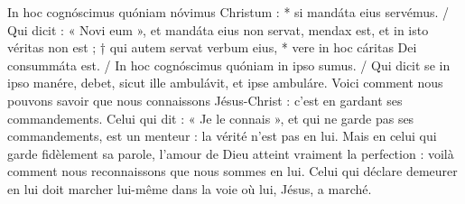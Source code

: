 \documentclass[Session2024.tex]{subfiles}
\begin{document}
{In hoc cognóscimus quóniam nóvimus Christum : * si mandáta eius
servémus. / Qui dicit : « Novi eum », et mandáta eius non servat, mendax
est, et in isto véritas non est ; † qui autem servat verbum eius, * vere in
hoc cáritas Dei consummáta est. / In hoc cognóscimus quóniam in ipso
sumus. / Qui dicit se in ipso manére, debet, sicut ille ambulávit, et ipse
ambuláre.}
{Voici comment nous pouvons savoir que nous connaissons Jésus-Christ :
c’est en gardant ses commandements. Celui qui dit : « Je le connais »,
et qui ne garde pas ses commandements, est un menteur : la vérité n’est
pas en lui. Mais en celui qui garde fidèlement sa parole, l’amour de Dieu
atteint vraiment la perfection : voilà comment nous reconnaissons que
nous sommes en lui. Celui qui déclare demeurer en lui doit marcher lui-même
dans la voie où lui, Jésus, a marché.}





\blessing

\end{document}
